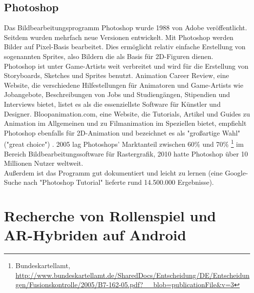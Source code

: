 \documentclass[extern,palatino]{cgBA}
\begin{document}
	\subsection{Photoshop}
	Das Bildbearbeitungsprogramm Photoshop wurde 1988 von Adobe veröffentlicht. Seitdem wurden mehrfach neue Versionen entwickelt. Mit Photoshop werden Bilder auf Pixel-Basis bearbeitet. Dies ermöglicht relativ einfache Erstellung von sogenannten Sprites, also Bildern die als Basis für 2D-Figuren dienen.
	\\
	Photoshop ist unter Game-Artists weit verbreitet und wird für die Erstellung von Storyboards, Sketches und Sprites benutzt. Animation Career Review, eine Website, die verschiedene Hilfestellungen für Animatoren und Game-Artists wie Jobangebote, Beschreibungen von Jobs und Studiengängen, Stipendien und Interviews bietet, listet es als die essenziellste Software für Künstler und Designer. Bloopanimation.com, eine Website, die Tutorials, Artikel und Guides zu Animation im Allgemeinen und zu Filmanimation im Speziellen bietet, empfiehlt Photoshop ebenfalls für 2D-Animation und bezeichnet es als "großartige Wahl" ("great choice")%
	. 2005 lag Photoshops' Marktanteil zwischen 60\% und 70\% \footnote{Bundeskartellamt, \url{http://www.bundeskartellamt.de/SharedDocs/Entscheidung/DE/Entscheidungen/Fusionskontrolle/2005/B7-162-05.pdf?\_\_blob=publicationFile\&v=3}
	} im Bereich Bildbearbeitungssoftware für Rastergrafik, 2010 hatte Photoshop über 10 Millionen Nutzer weltweit.%
	\\
	Außerdem ist das Programm gut dokumentiert und leicht zu lernen (eine Google-Suche nach "Photoshop Tutorial" lieferte rund 14.500.000 Ergebnisse). 
	\newpage
	
	\section{Recherche von Rollenspiel und AR-Hybriden auf Android}
\end{document}
